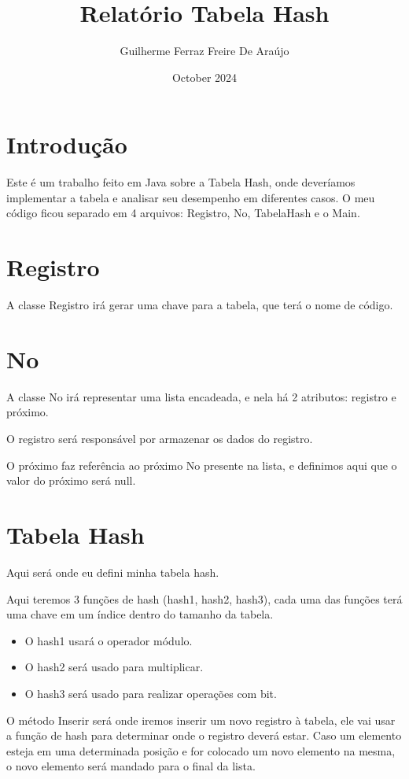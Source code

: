 \documentclass{article}
\title{Relatório Tabela Hash}
\author{Guilherme Ferraz Freire De Araújo}
\date{October 2024}
\begin{document}
\maketitle

\section{Introdução}
Este é um trabalho feito em Java sobre a Tabela Hash, onde deveríamos implementar a tabela e analisar seu desempenho em diferentes casos. O meu código ficou separado em 4 arquivos: Registro, No, TabelaHash e o Main.

\section{Registro}
A classe Registro irá gerar uma chave para a tabela, que terá o nome de código.

\section{No}
A classe No irá representar uma lista encadeada, e nela há 2 atributos: registro e próximo.

O registro será responsável por armazenar os dados do registro.

O próximo faz referência ao próximo No presente na lista, e definimos aqui que o valor do próximo será null.

\section{Tabela Hash}
Aqui será onde eu defini minha tabela hash.

Aqui teremos 3 funções de hash (hash1, hash2, hash3), cada uma das funções terá uma chave em um índice dentro do tamanho da tabela.
\begin{itemize}
    \item O hash1 usará o operador módulo.
    \item O hash2 será usado para multiplicar.
    \item O hash3 será usado para realizar operações com bit.
\end{itemize}

O método Inserir será onde iremos inserir um novo registro à tabela, ele vai usar a função de hash para determinar onde o registro deverá estar. Caso um elemento esteja em uma determinada posição e for colocado um novo elemento na mesma, o novo elemento será mandado para o final da lista.
\end{document}
